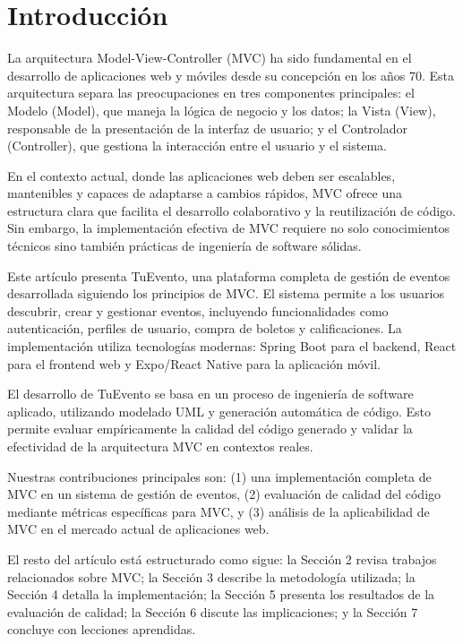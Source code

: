 \section{Introducción}

La arquitectura Model-View-Controller (MVC) ha sido fundamental en el desarrollo de aplicaciones web y móviles desde su concepción en los años 70. Esta arquitectura separa las preocupaciones en tres componentes principales: el Modelo (Model), que maneja la lógica de negocio y los datos; la Vista (View), responsable de la presentación de la interfaz de usuario; y el Controlador (Controller), que gestiona la interacción entre el usuario y el sistema.

En el contexto actual, donde las aplicaciones web deben ser escalables, mantenibles y capaces de adaptarse a cambios rápidos, MVC ofrece una estructura clara que facilita el desarrollo colaborativo y la reutilización de código. Sin embargo, la implementación efectiva de MVC requiere no solo conocimientos técnicos sino también prácticas de ingeniería de software sólidas.

Este artículo presenta TuEvento, una plataforma completa de gestión de eventos desarrollada siguiendo los principios de MVC. El sistema permite a los usuarios descubrir, crear y gestionar eventos, incluyendo funcionalidades como autenticación, perfiles de usuario, compra de boletos y calificaciones. La implementación utiliza tecnologías modernas: Spring Boot para el backend, React para el frontend web y Expo/React Native para la aplicación móvil.

El desarrollo de TuEvento se basa en un proceso de ingeniería de software aplicado, utilizando modelado UML y generación automática de código. Esto permite evaluar empíricamente la calidad del código generado y validar la efectividad de la arquitectura MVC en contextos reales.

Nuestras contribuciones principales son: (1) una implementación completa de MVC en un sistema de gestión de eventos, (2) evaluación de calidad del código mediante métricas específicas para MVC, y (3) análisis de la aplicabilidad de MVC en el mercado actual de aplicaciones web.

El resto del artículo está estructurado como sigue: la Sección 2 revisa trabajos relacionados sobre MVC; la Sección 3 describe la metodología utilizada; la Sección 4 detalla la implementación; la Sección 5 presenta los resultados de la evaluación de calidad; la Sección 6 discute las implicaciones; y la Sección 7 concluye con lecciones aprendidas.